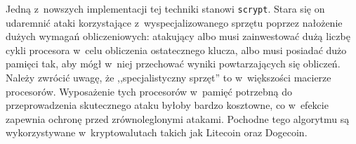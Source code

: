 Jedną z~nowszych implementacji tej techniki stanowi \texttt{scrypt}. Stara się
on udaremnić ataki korzystające z~wyspecjalizowanego sprzętu poprzez nałożenie
dużych wymagań obliczeniowych: atakujący albo musi zainwestować dużą liczbę
cykli procesora w~celu obliczenia ostatecznego klucza, albo musi posiadać dużo
pamięci tak, aby mógł w~niej przechować wyniki powtarzających się obliczeń.
Należy zwrócić uwagę, że ,,specjalistyczny sprzęt'' to w~większości macierze
procesorów. Wyposażenie tych procesorów w~pamięć potrzebną do przeprowadzenia
skutecznego ataku byłoby bardzo kosztowne, co w~efekcie zapewnia ochronę przed
zrównoleglonymi atakami.  Pochodne tego algorytmu są wykorzystywane
w~kryptowalutach takich jak Litecoin oraz Dogecoin.
